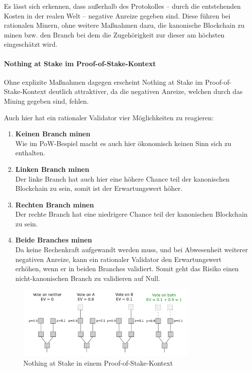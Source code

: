 Es lässt sich erkennen, dass außerhalb des Protokolles -- durch die entstehenden Kosten in der realen Welt -- negative Anreize gegeben sind. 
Diese führen bei rationalen Minern, ohne weitere Maßnahmen dazu, die kanonische Blockchain zu minen bzw. den Branch bei dem die Zugehörigkeit zur dieser am höchsten eingeschätzt wird.

\paragraph{Nothing at Stake im Proof-of-Stake-Kontext}

Ohne explizite Maßnahmen dagegen erscheint Nothing at Stake im Proof-of-Stake-Kontext deutlich attraktiver, da die negativen Anreize, welchen durch das Mining gegeben sind, fehlen.

Auch hier hat ein rationaler Validator vier Möglichkeiten zu reagieren:

\begin{enumerate}
    \item \textbf{Keinen Branch minen}\\
    Wie im PoW-Bespiel macht es auch hier ökonomisch keinen Sinn sich zu enthalten.
    
    \item \textbf{Linken Branch minen}\\
    Der linke Branch hat auch hier eine höhere Chance teil der kanonischen Blockchain zu sein, somit ist der Erwartungswert höher.
    
    \item \textbf{Rechten Branch minen}\\
    Der rechte Branch hat eine niedrigere Chance teil der kanonischen Blockchain zu sein.
    
    \item \textbf{Beide Branches minen}\\
    Da keine Rechenkraft aufgewandt werden muss, und bei Abwesenheit weiterer negativen Anreize, kann ein rationaler Validator den Erwartungswert erhöhen, wenn er in beiden Branches validiert. Somit geht das Risiko einen nicht-kanonischen Branch zu validieren auf Null.
\end{enumerate}

\begin{figure}[htb] 
	\centerline{\includegraphics*[width=0.8\textwidth]{img/ns_pos}}
\caption{Nothing at Stake in einem Proof-of-Stake-Kontext\protect\footnotemark} 
\label{fig:ns_pos}
\end{figure}

